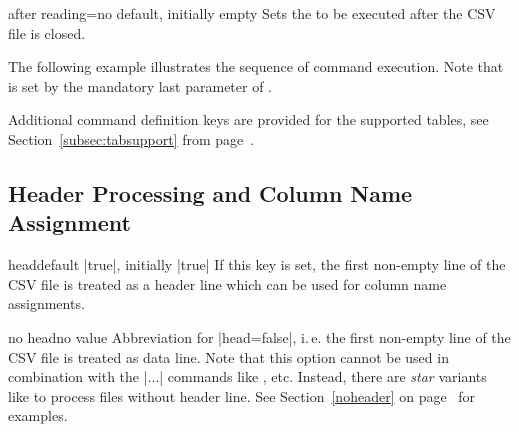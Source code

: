 \documentclass[a4paper,11pt]{ltxdoc}
\begin{document}
\begin{docCsvKey}{after reading}{=}{no default, initially empty}
  Sets the  to be executed after the CSV file is closed.
\end{docCsvKey}

\bigskip

The following example illustrates the sequence of command execution.
Note that  is set by the mandatory last
parameter of .

\begin{dispExample}
%
\end{dispExample}

Additional command definition keys are provided for the supported tables,
see Section~\ref{subsec:tabsupport} from page~\pageref{subsec:tabsupport}.

\clearpage
\subsection{Header Processing and Column Name Assignment}%

\begin{docCsvKey}[doc updated=2024-09-18]{head}{}{default |true|, initially |true|}
  If this key is set, the first non-empty line of the CSV file is treated as a header
  line which can be used for column name assignments.
\end{docCsvKey}


\begin{docCsvKey}{no head}{}{no value}
  Abbreviation for |head=false|, i.\,e. the first non-empty line of the CSV file is
  treated as data line.
  Note that this option cannot be used in combination with
  the |\csvauto...| commands like , etc.
  Instead, there are \emph{star} variants like  to
  process files without header line.
  See Section~\ref{noheader} on page~\pageref{noheader} for examples.
\end{docCsvKey}
\end{document}
